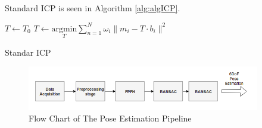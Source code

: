 Standard ICP is seen in Algorithm \ref{alg:algICP}.

\begin{algorithm}[H]
\SetAlgoLined
{}
 $T \leftarrow T_{0}$  \;
 {
   $T \leftarrow \underset{T}{\mathrm{argmin}} {\sum \limits_{n=1}^{N}\omega _{i}\|m_{i}-T \cdot b_{i}\|^{2}}$\;
}
\caption{Standar ICP}
\label{alg:algICP}
\end{algorithm}

\begin{figure}[!h]
\begin{center}
\includegraphics[width=4in]{diagrams/endpipeline.png}
\caption{Flow Chart of The Pose Estimation Pipeline}
\label{fig:icp}
\end{center}
\end{figure}




































